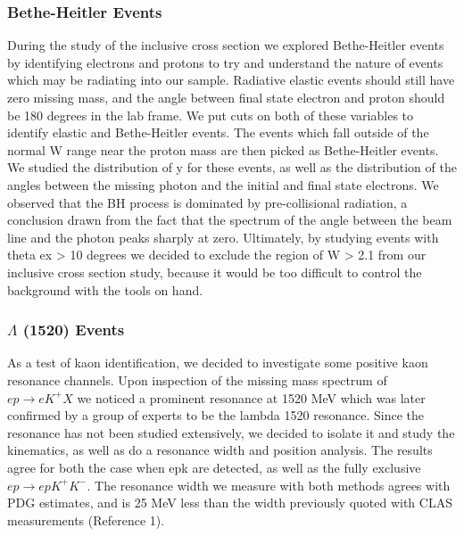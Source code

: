 \subsubsection{Bethe-Heitler Events}
During the study of the inclusive cross section we explored Bethe-Heitler events by identifying electrons and protons to try and understand the nature of events which may be radiating into our sample.  Radiative elastic events should still have zero missing mass, and the angle between final state electron and proton should be 180 degrees in the lab frame.  We put cuts on both of these variables to identify elastic and Bethe-Heitler events.  The events which fall outside of the normal W range near the proton mass are then picked as Bethe-Heitler events.  We studied the distribution of y for these events, as well as the distribution of the angles between the missing photon and the initial and final state electrons.  We observed that the BH process is dominated by pre-collisional radiation, a conclusion drawn from the fact that the spectrum of the angle between the beam line and the photon peaks sharply at zero.  Ultimately, by studying events with theta ex > 10 degrees we decided to exclude the region of W > 2.1 from our inclusive cross section study, because it would be too difficult to control the background with the tools on hand.    

\subsubsection{$\Lambda$ (1520) Events}
As a test of kaon identification, we decided to investigate some positive kaon resonance channels.  Upon inspection of the missing mass spectrum of $e p \rightarrow e K^{+} X$ we noticed a prominent resonance at 1520 MeV which was later confirmed by a group of experts to be the lambda 1520 resonance.  Since the resonance has not been studied extensively, we decided to isolate it and study the kinematics, as well as do a resonance width and position analysis.  The results agree for both the case when epk are detected, as well as the fully exclusive $e p \rightarrow e p K^{+} K^{-}$.  The resonance width we measure with both methods agrees with PDG estimates, and is 25 MeV less than the width previously quoted with CLAS measurements (Reference 1).

%
%
